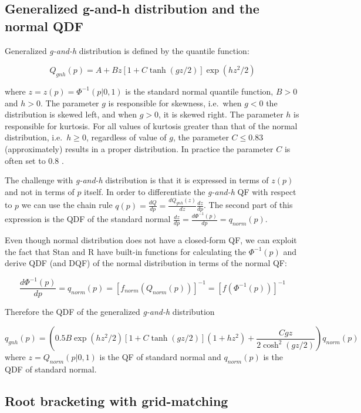 \documentclass[
  12pt,
]{article}
\begin{document}
\hypertarget{generalized-g-and-h-distribution-and-the-normal-qdf}{%
\subsection{Generalized g-and-h distribution and the normal QDF}\label{generalized-g-and-h-distribution-and-the-normal-qdf}}

Generalized \emph{g-and-h} distribution is defined by the quantile function:

\[
Q_{gnh}(p)=A+Bz[1+C\tanh(gz/2)]\exp(hz^2/2)
\]

where \(z=z(p)=\Phi^{-1}(p|0,1)\) is the standard normal quantile function, \(B>0\) and \(h>0\). The parameter \(g\) is responsible for skewness, i.e.~when \(g<0\) the distribution is skewed left, and when \(g>0\), it is skewed right. The parameter \(h\) is responsible for kurtosis. For all values of kurtosis greater than that of the normal distribution, i.e.~\(h\geq 0\), regardless of value of \(g\), the parameter \(C \leq 0.83\) (approximately) results in a proper distribution. In practice the parameter \(C\) is often set to 0.8 \citep{haynes2005BayesianEstimationGandk, rayner2002NumericalMaximumLikelihood}.

The challenge with \emph{g-and-h} distribution is that it is expressed in terms of \(z(p)\) and not in terms of \(p\) itself. In order to differentiate the \emph{g-and-h} QF with respect to \(p\) we can use the chain rule \(q(p)=\frac{dQ}{dp}=\frac{dQ_{gnh}(z)}{dz}\frac{dz}{dp}\). The second part of this expression is the QDF of the standard normal \(\frac{dz}{dp}=\frac{d\Phi^{-1}(p)}{dp}=q_{norm}(p)\).

Even though normal distribution does not have a closed-form QF, we can exploit the fact that Stan and R have built-in functions for calculating the \(\Phi^{-1}(p)\) and derive QDF (and DQF) of the normal distribution in terms of the normal QF:

\[\frac{d\Phi^{-1}(p)}{dp}=q_{norm}(p)=[f_{norm}(Q_{norm}(p))]^{-1}=[f(\Phi^{-1}(p))]^{-1}\]

Therefore the QDF of the generalized \emph{g-and-h} distribution

\[
q_{gnh}(p)=\left(0.5B\exp(hz^2/2)[1+C\tanh(gz/2)](1+hz^2)+ \frac{Cgz}{2\cosh^2(gz/2)}\right)q_{norm}(p)
\]
where \(z=Q_{norm}(p|0,1)\) is the QF of standard normal and \(q_{norm}(p)\) is the QDF of standard normal.

\hypertarget{root-bracketing-with-grid-matching}{%
\subsection{Root bracketing with grid-matching}\label{root-bracketing-with-grid-matching}}
\end{document}
